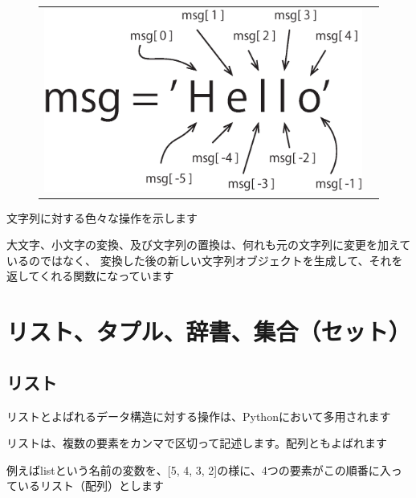 \documentclass[uplatex,a4paper,11pt,oneside,openany]{jsbook}
\begin{document}
\begin{figure}[H]
  \centering
  \begin{tabular}{lr}
      \begin{minipage}{0.5\hsize}
      \centering

      \end{minipage}
      \begin{minipage}{0.45\hsize}
      \flushright
\includegraphics[scale=0.33]{figures/eps/fig2.eps}
      \end{minipage}
    \end{tabular}
\end{figure}%

文字列に対する色々な操作を示します

大文字、小文字の変換、及び文字列の置換は、何れも元の文字列に変更を加えているのではなく、
変換した後の新しい文字列オブジェクトを生成して、それを返してくれる関数になっています



\section{リスト、タプル、辞書、集合（セット）}

\subsection{リスト}

リストとよばれるデータ構造に対する操作は、Pythonにおいて多用されます

リストは、複数の要素をカンマで区切って記述します。配列ともよばれます

例えばlistという名前の変数を、[5, 4, 3, 2]の様に、4つの要素がこの順番に入っているリスト（配列）とします
\end{document}
